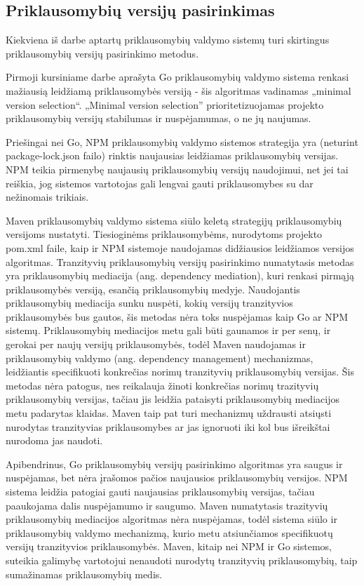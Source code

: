 \subsection{Priklausomybių versijų pasirinkimas}

Kiekviena iš darbe aptartų priklausomybių valdymo sistemų turi skirtingus priklausomybių versijų pasirinkimo metodus.

Pirmoji kursiniame darbe aprašyta Go priklausomybių valdymo sistema renkasi mažiausią leidžiamą priklausomybės versiją -
šis algoritmas vadinamas „minimal version selection“. „Minimal version selection”
prioritetizuojamas projekto priklausomybių versijų stabilumas ir nuspėjamumas, o ne jų naujumas.

Priešingai nei Go, NPM priklausomybių valdymo sistemos strategija yra (neturint package-lock.json failo)
rinktis naujausias leidžiamas priklausomybių versijas. NPM teikia pirmenybę naujausių priklausomybių versijų
naudojimui, net jei tai reiškia, jog sistemos vartotojas gali lengvai gauti priklausomybes su dar nežinomais trikiais.

Maven priklausomybių valdymo sistema siūlo keletą strategijų priklausomybių versijoms nustatyti. Tiesioginėms priklausomybėms,
nurodytoms projekto pom.xml faile, kaip ir NPM sistemoje naudojamas didžiausios leidžiamos versijos algoritmas.
Tranzityvių priklausomybių versijų pasirinkimo numatytasis metodas yra priklausomybių mediacija (ang. dependency mediation),
kuri renkasi pirmąją priklausomybės versiją, esančią priklausomybių medyje. Naudojantis priklausomybių mediacija sunku
nuspėti, kokių versijų tranzityvios priklausomybės bus gautos, šis metodas nėra toks nuspėjamas kaip Go ar NPM sistemų.
Priklausomybių mediacijos metu gali būti gaunamos ir per senų, ir gerokai per naujų versijų priklausomybės, todėl Maven
naudojamas ir priklausomybių valdymo (ang. dependency management) mechanizmas, leidžiantis specifikuoti konkrečias norimų
tranzityvių priklausomybių versijas. Šis metodas nėra patogus, nes reikalauja žinoti konkrečias norimų trazityvių priklausomybių
versijas, tačiau jis leidžia pataisyti priklausomybių mediacijos metu padarytas klaidas. Maven taip pat turi mechanizmų
uždrausti atsiųsti nurodytas tranzityvias priklausomybes ar jas ignoruoti iki kol bus išreikštai nurodoma jas naudoti.

Apibendrinus, Go priklausomybių versijų pasirinkimo algoritmas yra saugus ir nuspėjamas, bet nėra įrašomos pačios
naujausios priklausomybių versijos. NPM sistema leidžia patogiai gauti naujausias priklausomybių versijas, tačiau
paaukojama dalis nuspėjamumo ir saugumo. Maven numatytasis trazityvių priklausomybių mediacijos algoritmas nėra nuspėjamas,
todėl sistema siūlo ir priklausomybių valdymo mechanizmą, kurio metu atsiunčiamos specifikuotų versijų tranzityvios priklausomybės.
Maven, kitaip nei NPM ir Go sistemos, suteikia galimybę vartotojui nenaudoti nurodytų tranzityvių priklausomybių,
taip sumažinamas priklausomybių medis.
